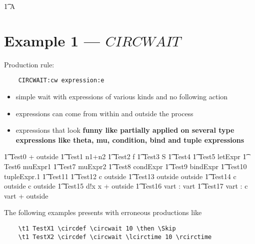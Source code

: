 \documentclass{article}
\begin{document}
\begin{circusaction}
	\t1 A \circdef \Skip
\end{circusaction}

\newpage
\section{Example 1 --- $CIRCWAIT$}

Production rule: 
\begin{verbatim}
	CIRCWAIT:cw expression:e
\end{verbatim}
%
\begin{itemize}
   \item simple wait with expressions of various kinds and no following action
   \item expressions can come from within and outside the process
   \item expressions that look {\bf funny like partially applied on several type expressions like theta, mu, condition, bind and tuple expressions}
\end{itemize}
%
\begin{circusaction}
   \t1 Test0 \circdef {} + outside
   \also
   \t1 Test1 \circdef \circwait n1+n2 
   \also
   \t1 Test2 \circdef \circwait f 
   \also
   \t1 Test3 \circdef \circwait \theta S 
   \also
   \t1 Test4 \circdef \circwait [~ x: \nat | x > 10 ~] 
   \also
   \t1 Test5 \circdef \circwait letExpr
   \also
   \t1 Test6 \circdef \circwait muExpr1
   \also
   \t1 Test7 \circdef \circwait muExpr2
   \also
   \t1 Test8 \circdef \circwait condExpr
   \also
   \t1 Test9 \circdef \circwait bindExpr
   \also
   \t1 Test10 \circdef \circwait tupleExpr.1
   \also
   \t1 Test11 \circdef {} 
   \also
   \t1 Test12 \circdef c \then \circwait outside
   \also
   \t1 Test13 \circdef \circwait outside \circseq \circwait outside
   \also
   \t1 Test14 \circdef c \then \circwait outside \circseq c \then \circwait outside
   \also
   \t1 Test15 \circdef d!x \then \circwait x + outside
   \also
   \t1 Test16 \circdef \circvres vart : \nat  \circspot \circwait vart 
   \also
   \t1 Test17 \circdef \circvres vart : \nat  \circspot c \then \circwait vart + outside
\end{circusaction}
%
The following examples presents with erroneous productions like
\begin{verbatim}
	\t1 TestX1 \circdef \circwait 10 \then \Skip
	\t1 TestX2 \circdef \circwait \lcirctime 10 \rcirctime 
\end{verbatim}
\end{document}

